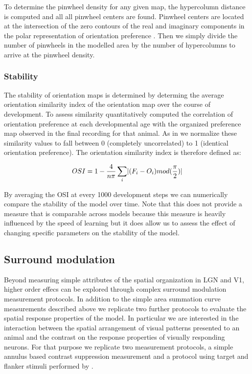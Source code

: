 To determine the pinwheel density for any given map, the hypercolumn
distance is computed and all all pinwheel centers are found. Pinwheel
centers are located at the intersection of the zero contours of the
real and imaginary components in the polar representation of
orientation preference \citep{Lowel1998}. Then we simply divide the
number of pinwheels in the modelled area by the number of hypercolumns
to arrive at the pinwheel density.

\subsubsection{Stability}

The stability of orientation maps is determined by determing the
average orientation similarity index of the orientation map over the
course of development. To assess similarity quantitatively
\cite{Chapman1996} computed the correlation of orientation preference
at each developmental age with the organized preference map observed
in the final recording for that animal. As in \cite{Stevens2013} we
normalize these similarity values to fall between 0 (completely
uncorrelated) to 1 (identical orientation preference). The orientation
similarity index is therefore defined as:

\begin{equation}
  OSI = 1 - \frac{4}{n\pi} \sum_{i}\lvert(F_{i}-O_{i})mod(\frac{\pi}{2})\rvert
\end{equation}

By averaging the OSI at every 1000 development steps we can
numerically compare the stability of the model over time. Note that
this does not provide a measure that is comparable across models
because this measure is heavily influenced by the speed of learning
but it does allow us to assess the effect of changing specific
parameters on the stability of the model.

\subsection{Surround modulation}

Beyond measuring simple attributes of the spatial organization in LGN
and V1, higher order effecs can be explored through complex surround
modulation measurement protocols. In addition to the simple area
summation curve measurements described above we replicate two further
protocols to evaluate the spatial response properties of the model.
In particular we are interested in the interaction between the spatial
arrangement of visual patterns presented to an animal and the contrast
on the response properties of visually responding neurons. For that
purpose we replicate two measurement protocols, a simple annulus based
contrast suppression measurement \cite{Jones2002} and a protocol using
target and flanker stimuli performed by \cite{Kapadia1995}.

